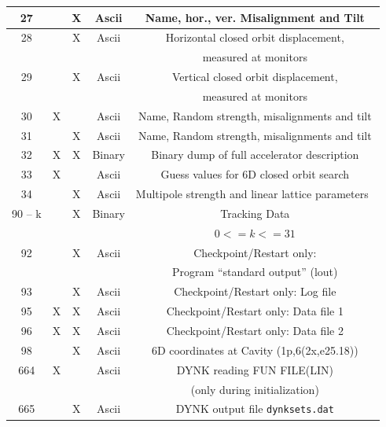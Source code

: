 \documentclass[a4paper,11pt]{report}
\begin{document}
\begin{center}
\begin{longtable}{|c|c|c|c|c|}
  \hline \rule[-3.75mm]{0mm}{10mm}
  27 & & X & Ascii & Name, hor., ver. Misalignment and Tilt \\
  \hline \rule[-1.75mm]{0mm}{10mm}
  28 & & X & Ascii & Horizontal closed orbit displacement, \\*
  \rule[-3.7mm]{0mm}{7.5mm}
  & &   &       & measured at monitors \\
  \hline \rule[-1.75mm]{0mm}{10mm}
  29 & & X & Ascii & Vertical closed orbit displacement, \\*
  \rule[-3.7mm]{0mm}{7.5mm}
  & &   &       & measured at monitors \\
  \hline \rule[-3.75mm]{0mm}{10mm}
  30 & X & & Ascii & Name, Random strength, misalignments and tilt \\
  \hline \rule[-3.75mm]{0mm}{10mm}
  31 & & X & Ascii & Name, Random strength, misalignments and tilt \\
  \hline \rule[-3.75mm]{0mm}{10mm}
  32 & X & X & Binary & Binary dump of full accelerator description \\
  \hline \rule[-3.75mm]{0mm}{10mm}
  33 & X & & Ascii & Guess values for 6D closed orbit search \\
  \hline \rule[-3.75mm]{0mm}{10mm}
  34 & & X & Ascii & Multipole strength and linear lattice
    parameters~\cite{SODD} \\ 
  \hline \rule[-1.25mm]{0mm}{7.5mm}
  90 -- k & & X & Binary & Tracking Data \\*
  \rule[-3.7mm]{0mm}{7.5mm}
  & & & & $ 0 <= k <= 31 $ \\
  \hline \rule[-3.75mm]{0mm}{10mm}
  92 & & X & Ascii & Checkpoint/Restart only: \\*
  \rule[-3.7mm]{0mm}{7.5mm}
  & & & & Program ``standard output'' (lout) \\
  \hline \rule[-3.75mm]{0mm}{10mm}
  93 & & X & Ascii & Checkpoint/Restart only: Log file \\
  \hline \rule[-3.75mm]{0mm}{10mm}
  95 & X & X & Ascii & Checkpoint/Restart only: Data file 1 \\
  \hline \rule[-3.75mm]{0mm}{10mm}
  96 & X & X & Ascii & Checkpoint/Restart only: Data file 2 \\
  \hline \rule[-3.75mm]{0mm}{10mm}
  98 & & X & Ascii & 6D coordinates at Cavity (1p,6(2x,e25.18)) \\
  \hline \rule[-3.75mm]{0mm}{10mm}
  664 & X &  & Ascii & DYNK reading FUN FILE(LIN) \\*
  \rule[-3.7mm]{0mm}{7.5mm}
  & & & & (only during initialization) \\
  \hline \rule[-3.75mm]{0mm}{10mm}
  665 & & X & Ascii & DYNK output file \texttt{dynksets.dat} \\
  \hline
\end{longtable}
\end{center}
\end{document}
